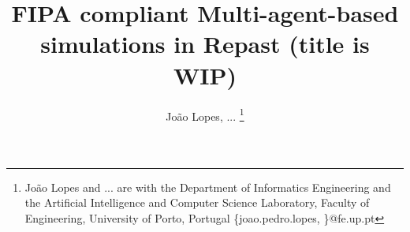 
\title{\LARGE \bf
FIPA compliant Multi-agent-based simulations in Repast (title is WIP)
}


\author{João Lopes, ... %
    \thanks{João Lopes and ... are
    	with the Department of Informatics Engineering and the Artificial
    	Intelligence and Computer Science Laboratory, Faculty of Engineering,
    	University of Porto, Portugal
    	\{joao.pedro.lopes, \}@fe.up.pt } %
}